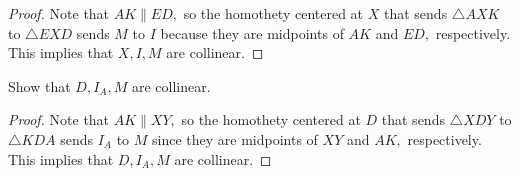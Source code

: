 \documentclass[letterpaper,oneside]{scrartcl}
\begin{document}
\begin{proof}
  Note that $AK \parallel ED,$ so the homothety centered at $X$ that sends $\triangle AXK$ to $\triangle EXD$ sends $M$ to $I$ because they are midpoints of $AK$ and $ED,$ respectively. This implies that $X,I,M$ are collinear.
\end{proof}
\begin{problem*}
  [4.13]
  Show that $D,I_A,M$ are collinear.
\end{problem*}
\begin{proof}
  Note that $AK \parallel XY,$ so the homothety centered at $D$ that sends $\triangle XDY$ to $\triangle KDA$ sends $I_A$ to $M$ since they are midpoints of $XY$ and $AK,$ respectively. This implies that $D,I_A,M$ are collinear.
\end{proof}
\end{document}

